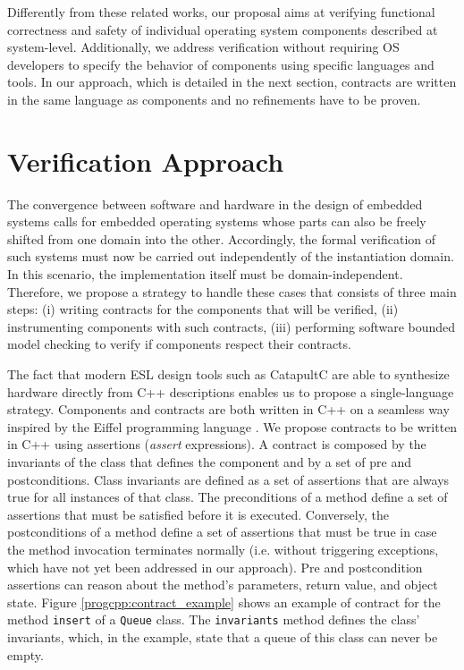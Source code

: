 \documentclass{sig-alternate}
\begin{document}
Differently from these related works, our proposal aims at verifying
functional correctness and safety of individual operating system
components described at system-level. Additionally, we address
verification without requiring OS developers to specify the behavior of
components using specific languages and tools. In our approach, which is
detailed in the next section, contracts are written in the same language
as components and no refinements have to be proven.

\section{Verification Approach} \label{proposal} 

The convergence between software and hardware in the design of embedded
systems calls for embedded operating systems whose parts can also be
freely shifted from one domain into the other. Accordingly, the formal
verification of such systems must now be carried out independently of
the instantiation domain. In this scenario, the implementation itself
must be domain-independent. Therefore, we propose a strategy to handle
these cases that consists of three main steps: (i) writing contracts for
the components that will be verified, (ii) instrumenting components with
such contracts, (iii) performing software bounded model checking to
verify if components respect their contracts.

The fact that modern ESL design tools such as CatapultC
\cite{Calypto:Catapult} are able to synthesize hardware directly from
C++ descriptions enables us to propose a single-language strategy.
Components and contracts are both written in C++ on a seamless way
inspired by the Eiffel programming language \cite{Meyer:1992}. We
propose contracts to be written in C++ using assertions (\emph{assert}
expressions).  A contract is composed by the invariants of the class
that defines the component and by a set of pre and postconditions.
Class invariants are defined as a set of assertions that are always true
for all instances of that class.  The preconditions of a method define a
set of assertions that must be satisfied before it is executed.
Conversely, the postconditions of a method define a set of assertions
that must be true in case the method invocation terminates normally
(i.e. without triggering exceptions, which have not yet been addressed
in our approach).  Pre and postcondition assertions can reason about the
method's parameters, return value, and object state.  Figure
\ref{progcpp:contract_example} shows an example of contract for the
method \texttt{insert} of a \texttt{Queue} class.  The
\texttt{invariants} method defines the class' invariants, which, in the
example, state that a queue of this class can never be empty.
\end{document}
